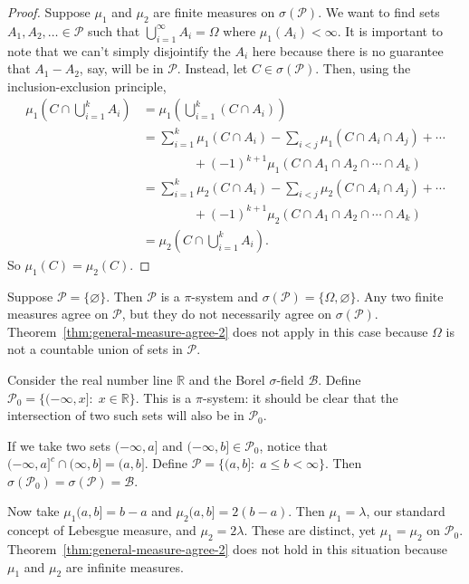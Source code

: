 \documentclass[11pt,fleqn]{book} %
\begin{document}
\begin{proof}
	Suppose $\mu_1$ and $\mu_2$ are finite measures on $\sigma(\mathcal{P})$. We want to find sets $A_1,A_2,\dots \in \mathcal{P}$ such that $\bigcup_{i=1}^\infty A_i = \Omega$ where $\mu_1(A_i) < \infty$. It is important to note that we can't simply disjointify the $A_i$ here because there is no guarantee that $A_1-A_2$, say, will be in $\mathcal{P}$. Instead, let $C \in \sigma(\mathcal{P})$. Then, using the inclusion-exclusion principle,
	\begin{align*}
		\mu_1 \left( C \cap \bigcup_{i=1}^k A_i \right) &= \mu_1 \left( \bigcup_{i=1}^k (C \cap A_i) \right) \\
		&= \sum_{i=1}^k \mu_1(C \cap A_i) - \sum_{i < j} \mu_1(C \cap A_i \cap A_j) + \cdots \\
		&\qquad \qquad + (-1)^{k+1} \mu_1(C \cap A_1 \cap A_2 \cap \cdots \cap A_k) \\
		&= \sum_{i=1}^k \mu_2(C \cap A_i) - \sum_{i < j} \mu_2(C \cap A_i \cap A_j) + \cdots \\
		&\qquad \qquad + (-1)^{k+1} \mu_2(C \cap A_1 \cap A_2 \cap \cdots \cap A_k) \\
		&= \mu_2 \left( C \cap \bigcup_{i=1}^k A_i \right).
	\end{align*}
	So $\mu_1(C) = \mu_2(C)$.
\end{proof}

\begin{example} \label{ex:2.2}
	Suppose $\mathcal{P} = \{\varnothing\}$. Then $\mathcal{P}$ is a $\pi$-system and $\sigma(\mathcal{P}) = \{\Omega,\varnothing\}$. Any two finite measures agree on $\mathcal{P}$, but they do not necessarily agree on $\sigma(\mathcal{P})$. Theorem~\ref{thm:general-measure-agree-2} does not apply in this case because $\Omega$ is not a countable union of sets in $\mathcal{P}$.
\end{example}

\begin{example} \label{ex:2.3}
	Consider the real number line $\mathbb{R}$ and the Borel $\sigma$-field $\mathcal{B}$. Define $\mathcal{P}_0 = \{(-\infty,x]:\;x \in \mathbb{R}\}$. This is a $\pi$-system: it should be clear that the intersection of two such sets will also be in $\mathcal{P}_0$.

	If we take two sets $(-\infty,a]$ and $(-\infty,b] \in \mathcal{P}_0$, notice that $(-\infty,a]^c \cap (\infty,b] = (a,b]$. Define $\mathcal{P} = \{(a,b]:\;a \leq b < \infty\}$. Then $\sigma(\mathcal{P}_0) = \sigma(\mathcal{P}) = \mathcal{B}$.

	Now take $\mu_1(a,b] = b-a$ and $\mu_2(a,b] = 2(b-a)$. Then $\mu_1 = \lambda$, our standard concept of Lebesgue measure, and $\mu_2 = 2\lambda$. These are distinct, yet $\mu_1 = \mu_2$ on $\mathcal{P}_0$. Theorem~\ref{thm:general-measure-agree-2} does not hold in this situation because $\mu_1$ and $\mu_2$ are infinite measures.
\end{example}
\end{document}
